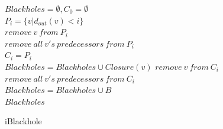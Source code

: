 \documentclass[12pt,a4paper,oneside]{article}
\theoremstyle{definition}
\theoremstyle{lemma}
\theoremstyle{remark}
\begin{document}
\begin{figure}[H]
\begin{center}
\begin{algorithm}[H]
                        $Blackholes = \emptyset, C_0 = \emptyset$ \\
                         {
                            $P_i = \{v | d_{out}(v) < i\}$
                             \\
                             {
                                 {
                                     {
                                        $remove\ v\ from\ P_i$\\
                                        $remove\ all\ v's\ predecessors\ from\ P_i$\\
                                    }
                                }
                            }
                        }
                        $C_i = P_i$   \\
                         {
                             {
                                $Blackholes = Blackholes \cup Closure(v)$
                            }
                             {
                                $remove\ v\ from\ C_i$ \\
                                $remove\ all\ v's\ predecessors\ from\ C_i$ \\
                            }
                        }
                         {
                             {
                                 {
                                    $Blackholes = Blackholes \cup B$ \\
                                }
                            }
                        }
                        \Return $Blackholes$
			\label{alg:iblackhole}
			\caption{iBlackhole}
		\end{algorithm}
	\end{center}
\end{figure}
\end{document}
